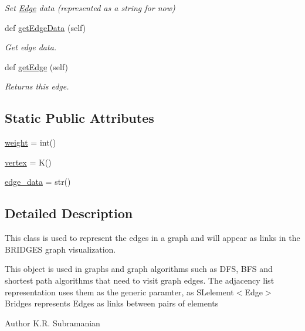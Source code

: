 \begin{DoxyCompactItemize}
\begin{DoxyCompactList}\small\item\em Set \hyperlink{class_edge_1_1_edge}{Edge} data (represented as a string for now) \end{DoxyCompactList}\item 
def \hyperlink{class_edge_1_1_edge_af1ad9cb4a110bd498051374523eb725c}{get\+Edge\+Data} (self)
\begin{DoxyCompactList}\small\item\em Get edge data. \end{DoxyCompactList}\item 
def \hyperlink{class_edge_1_1_edge_a889f02a79ded7ba366a0f1dfd7c6158a}{get\+Edge} (self)
\begin{DoxyCompactList}\small\item\em Returns this edge. \end{DoxyCompactList}\end{DoxyCompactItemize}
\subsection*{Static Public Attributes}
\begin{DoxyCompactItemize}
\item 
\hyperlink{class_edge_1_1_edge_a0f1b80578fe4bafb45c269111bf9822c}{weight} = int()
\item 
\hyperlink{class_edge_1_1_edge_a024c98580ed6649429e1996725333c7b}{vertex} = K()
\item 
\hyperlink{class_edge_1_1_edge_a7c92348b4e8e4f5027bc2fd230e353e7}{edge\+\_\+data} = str()
\end{DoxyCompactItemize}


\subsection{Detailed Description}
This class is used to represent the edges in a graph and will appear as links in the B\+R\+I\+D\+G\+ES graph visualization. 

This object is used in graphs and graph algorithms such as D\+FS, B\+FS and shortest path algorithms that need to visit graph edges. The adjacency list representation uses them as the generic paramter, as S\+Lelement$<$\+Edge$>$ Bridges represents Edges as links between pairs of elements

\begin{DoxyAuthor}{Author}
K.\+R. Subramanian
\end{DoxyAuthor}

